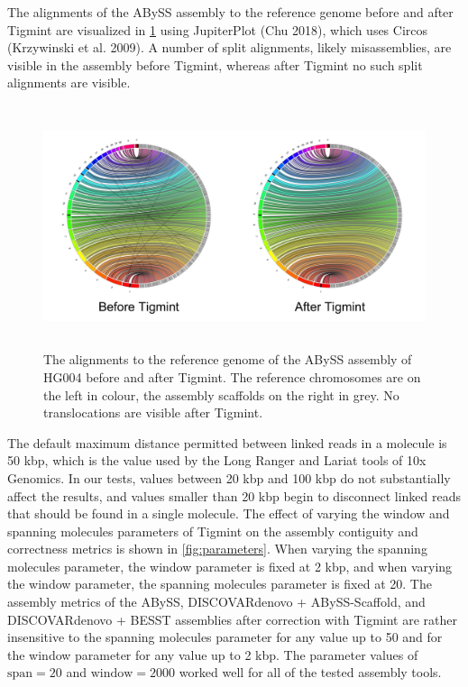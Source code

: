 \documentclass[
  12pt,
  oneside,
  openany]{book}
\begin{document}
The alignments of the ABySS assembly to the reference genome before and after Tigmint are visualized in \cref{fig:tigmint-jupiter} using JupiterPlot (Chu 2018), which uses Circos (Krzywinski et al. 2009). A number of split alignments, likely misassemblies, are visible in the assembly before Tigmint, whereas after Tigmint no such split alignments are visible.

\begin{figure}
\hypertarget{fig:tigmint-jupiter}{%
\centering
\includegraphics[width=\textwidth,height=2.8in]{tigmint/jupiter.png}
\caption[The alignments to the reference genome of the ABySS assembly of HG004 before and after Tigmint.]{The alignments to the reference genome of the ABySS assembly of HG004 before and after Tigmint. The reference chromosomes are on the left in colour, the assembly scaffolds on the right in grey. No translocations are visible after Tigmint.}\label{fig:tigmint-jupiter}
}
\end{figure}

The default maximum distance permitted between linked reads in a molecule is 50 kbp, which is the value used by the Long Ranger and Lariat tools of 10x Genomics. In our tests, values between 20 kbp and 100 kbp do not substantially affect the results, and values smaller than 20 kbp begin to disconnect linked reads that should be found in a single molecule. The effect of varying the window and spanning molecules parameters of Tigmint on the assembly contiguity and correctness metrics is shown in \cref{fig:parameters}. When varying the spanning molecules parameter, the window parameter is fixed at 2 kbp, and when varying the window parameter, the spanning molecules parameter is fixed at 20. The assembly metrics of the ABySS, DISCOVARdenovo + ABySS-Scaffold, and DISCOVARdenovo + BESST assemblies after correction with Tigmint are rather insensitive to the spanning molecules parameter for any value up to 50 and for the window parameter for any value up to 2 kbp. The parameter values of \(\textrm{span} = 20\) and \(\textrm{window} = 2000\) worked well for all of the tested assembly tools.
\end{document}

